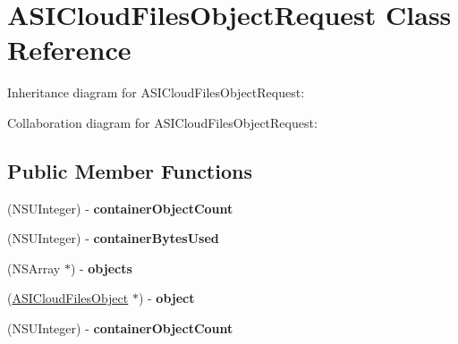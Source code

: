 \hypertarget{interface_a_s_i_cloud_files_object_request}{
\section{\-A\-S\-I\-Cloud\-Files\-Object\-Request \-Class \-Reference}
\label{interface_a_s_i_cloud_files_object_request}
}


\-Inheritance diagram for \-A\-S\-I\-Cloud\-Files\-Object\-Request\-:


\-Collaboration diagram for \-A\-S\-I\-Cloud\-Files\-Object\-Request\-:
\subsection*{\-Public \-Member \-Functions}
\begin{DoxyCompactItemize}
\item 
\hypertarget{interface_a_s_i_cloud_files_object_request_a4f12e705e357eaaa07054597da6d0353}{
(\-N\-S\-U\-Integer) -\/ {\bfseries container\-Object\-Count}}
\label{interface_a_s_i_cloud_files_object_request_a4f12e705e357eaaa07054597da6d0353}

\item 
\hypertarget{interface_a_s_i_cloud_files_object_request_a12f44f896f4d06f584b4d2728871af19}{
(\-N\-S\-U\-Integer) -\/ {\bfseries container\-Bytes\-Used}}
\label{interface_a_s_i_cloud_files_object_request_a12f44f896f4d06f584b4d2728871af19}

\item 
\hypertarget{interface_a_s_i_cloud_files_object_request_ae0ed5d45087aa5b001e254855782d7f4}{
(\-N\-S\-Array $\ast$) -\/ {\bfseries objects}}
\label{interface_a_s_i_cloud_files_object_request_ae0ed5d45087aa5b001e254855782d7f4}

\item 
\hypertarget{interface_a_s_i_cloud_files_object_request_a09867f7fb46ac33557d169f68ba29d92}{
(\hyperlink{interface_a_s_i_cloud_files_object}{\-A\-S\-I\-Cloud\-Files\-Object} $\ast$) -\/ {\bfseries object}}
\label{interface_a_s_i_cloud_files_object_request_a09867f7fb46ac33557d169f68ba29d92}

\item 
\hypertarget{interface_a_s_i_cloud_files_object_request_a4f12e705e357eaaa07054597da6d0353}{
(\-N\-S\-U\-Integer) -\/ {\bfseries container\-Object\-Count}}
\label{interface_a_s_i_cloud_files_object_request_a4f12e705e357eaaa07054597da6d0353}


\end{DoxyCompactItemize}
